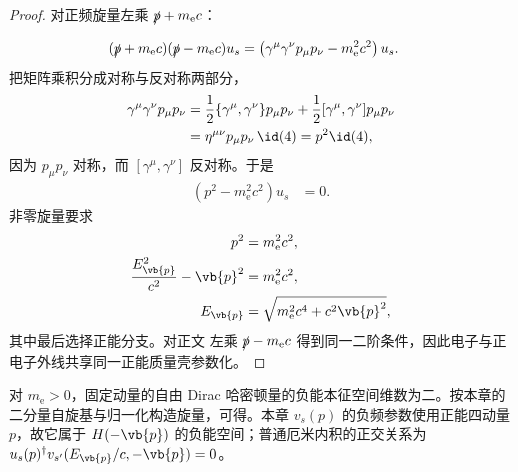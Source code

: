 \begin{proof}
对正频旋量左乘 $\slashed p+m_{\mathrm e} c$：

\begin{align*}
 (\slashed p+m_{\mathrm e} c)(\slashed p-m_{\mathrm e} c)u_s
 &=\left(\gamma^\mu\gamma^\nu p_\mu p_\nu-m_{\mathrm e}^2c^2\right)u_s.
\end{align*}
把矩阵乘积分成对称与反对称两部分，
\begin{align*}
 \gamma^\mu\gamma^\nu p_\mu p_\nu
 &=\frac12\{\gamma^\mu,\gamma^\nu\}p_\mu p_\nu
 +\frac12[\gamma^\mu,\gamma^\nu]p_\mu p_\nu\\
 &=\eta^{\mu\nu}p_\mu p_\nu\,\id(4)
 =p^2\id(4),
\end{align*}
因为 $p_\mu p_\nu$ 对称，而 $[\gamma^\mu,\gamma^\nu]$ 反对称。于是
\begin{align*}
 (p^2-m_{\mathrm e}^2c^2)u_s&=0.
\end{align*}
非零旋量要求
\begin{align*}
 p^2&=m_{\mathrm e}^2c^2,\\
 \frac{E_{\vb{p}}^2}{c^2}-\vb{p}^2&=m_{\mathrm e}^2c^2,\\
 E_{\vb{p}}&=\sqrt{m_{\mathrm e}^2c^4+c^2\vb{p}^2},
\end{align*}
其中最后选择正能分支。对正文 左乘 $\slashed p-m_{\mathrm e} c$ 得到同一二阶条件，因此电子与正电子外线共享同一正能质量壳参数化。
\end{proof}

\begin{proposition}[自由负能旋量的构造]
对 $m_{\mathrm e}>0$，固定动量的自由 Dirac 哈密顿量的负能本征空间维数为二。按本章的二分量自旋基与归一化构造旋量，可得。本章 $v_s(p)$ 的负频参数使用正能四动量 $p$，故它属于 $H(-\vb{p})$ 的负能空间；普通厄米内积的正交关系为 $u_s(p)^\dagger v_{s'}(E_{\vb{p}}/c,-\vb{p})=0$。
\end{proposition}

